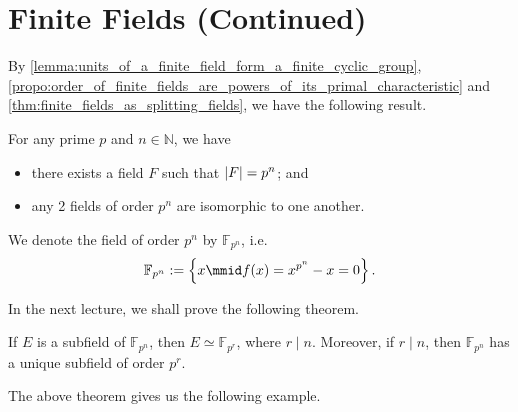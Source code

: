 \documentclass[notoc,notitlepage]{tufte-book}
\begin{document}
\section{Finite Fields (Continued)}%
\label{sec:finite_fields_continued}

By \cref{lemma:units_of_a_finite_field_form_a_finite_cyclic_group},
\cref{propo:order_of_finite_fields_are_powers_of_its_primal_characteristic} and
\cref{thm:finite_fields_as_splitting_fields}, we have the following result.

\begin{thm}\label{thm:classification_of_finite_fields}
  For any prime $p$ and $n \in \mathbb{N}$, we have
  \begin{itemize}
    \item there exists a field $F$ such that $\left|F\right| = p^n$; and
    \item any 2 fields of order $p^n$ are isomorphic to one another.
  \end{itemize}
\end{thm}

\begin{note}[Notation]
  We denote the field of order $p^n$ by $\mathbb{F}_{p^n}$, i.e.
  \begin{equation*}
    \mathbb{F}_{p^n} := \left\{ x \mmid f(x) = x^{p^n} - x = 0 \right\}.
  \end{equation*}
\end{note}

In the next lecture, we shall prove the following theorem.

\begin{thmnonum}\label{thmnonum:subfields_of_finite_fields}
  If $E$ is a subfield of $\mathbb{F}_{p^n}$, then $E \simeq \mathbb{F}_{p^r}$, where $r
  \mid n$. Moreover, if $r \mid n$, then $\mathbb{F}_{p^n}$ has a unique subfield of order
  $p^r$.
\end{thmnonum}

The above theorem gives us the following example.
\end{document}
